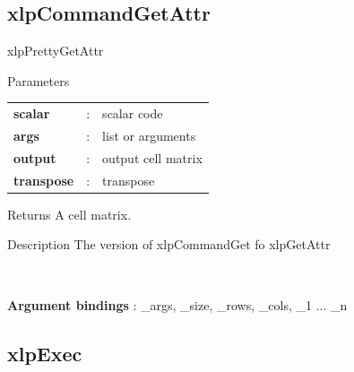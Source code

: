 \subsection{xlpCommandGetAttr}

\begin{xlpfunctitle}{xlpPrettyGetAttr}

\begin{xlpfunc}{Parameters}
\begin{tabular}{p{3.5cm}cl}
\textbf{scalar}& : & scalar code \\
\textbf{args}& : & list or arguments \\
\textbf{output}& : & output cell matrix\\
\textbf{transpose}& : & transpose \\
\end{tabular}

\vspace{2mm}

\end{xlpfunc}


\begin{xlpfunc}{Returns}
A cell matrix.
\end{xlpfunc}

\begin{xlpfunc}{Description}
The version of xlpCommandGet fo xlpGetAttr

\

\textbf{Argument bindings} : \_args, \_size, \_rows, \_cols, \_1 ... \_n

\end{xlpfunc}
\end{xlpfunctitle}









\subsection{xlpExec}


